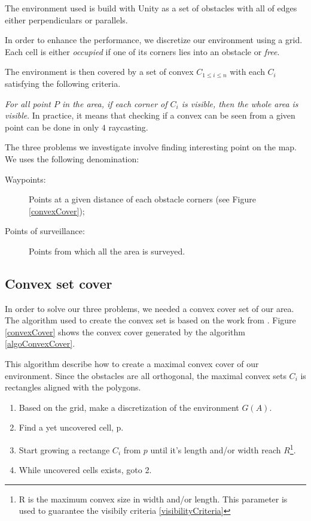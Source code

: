 The environment used is build with Unity as a set of obstacles with all of edges either perpendiculars or parallels.

In order to enhance the performance, we discretize our environment using a grid. Each cell is either \emph{occupied} if one of its corners lies into an obstacle or \emph{free}.

The environment is then covered by a set of convex $C_{1\leq i \leq n}$ with each $C_i$ satisfying the following criteria.

\begin{criteria}[of Visibility]
 \emph{For all point $P$ in the area, if each corner of $C_i$ is visible, then the whole area is visible}. In practice, it means that checking if a convex can be seen from a given point can be done in only $4$ raycasting.
\label{visibilityCriteria}
\end{criteria}

The three problems we investigate involve finding interesting point on the map. We uses the following denomination:
\begin{description}
	\item[Waypoints:] Points at a given distance of each obstacle corners (see Figure \ref{convexCover});
	\item[Points of surveillance:] Points from which all the area is surveyed.
\end{description}

\subsection{Convex set cover}

In order to solve our three problems, we needed a convex cover set of our area. The algorithm used to create the convex set is based on the work from \cite{CoopMinTime}. Figure \ref{convexCover} shows the convex cover generated by the algorithm \ref{algoConvexCover}.

\begin{algorithm}
This algorithm describe how to create a maximal convex cover of our environment. Since the obstacles are all orthogonal, the maximal convex sets $C_i$ is rectangles aligned with the polygons.
\begin{enumerate}
\item Based on the grid, make a discretization of the environment $G(A)$.
\item Find a yet uncovered cell, p.
\item Start growing a rectange $C_i$ from $p$ until it's length and/or width reach $R$\footnote{R is the maximum convex size in width and/or length. This parameter is used to guarantee the visibily criteria \ref{visibilityCriteria}}.
\item While uncovered cells exists, goto 2.
\end{enumerate}
\label{algoConvexCover}
\end{algorithm}

